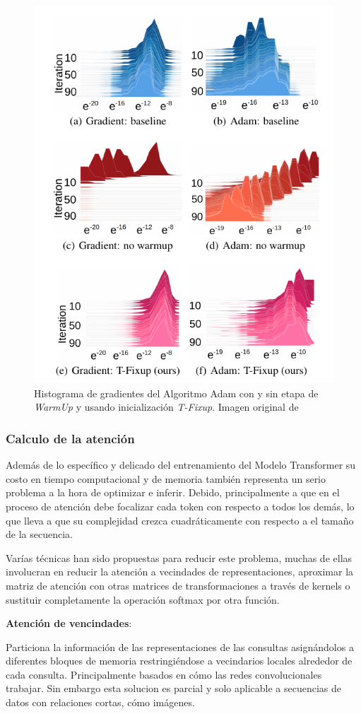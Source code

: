 \begin{figure}[ht!]
    \centering
    \includegraphics[width=0.5 \textwidth]{Chapters/1. Transformer/Figures/transformer/tfixup.png}
    \caption{Histograma de gradientes del Algoritmo Adam con y sin etapa de \textit{WarmUp} y
    usando inicialización \textit{T-Fixup}. Imagen original de \citeauthor{pmlr-v119-huang20f}}
    \label{fig:t-fixup}
\end{figure}

\subsubsection{Calculo de la atención}

Además de lo específico y delicado del entrenamiento del Modelo Transformer su costo en tiempo
computacional y de memoria también representa un serio problema a la hora de optimizar e inferir.
Debido, principalmente a que en el proceso de atención debe focalizar cada token con respecto a todos
los demás, lo que lleva a que su complejidad crezca cuadráticamente con respecto a el tamaño de la
secuencia.

Varías técnicas han sido propuestas para reducir este problema, muchas de ellas involucran en reducir
la atención a vecindades de representaciones, aproximar la matriz de atención con otras matrices de
transformaciones a través de kernels o sustituir completamente la operación softmax por otra función.

\textbf{Atención de vencindades}:

\citeauthor*{DBLP:journals/corr/abs-1802-05751} Particiona la información de las representaciones de
las consultas asignándolos a diferentes bloques de memoria restringiéndose a vecindarios locales
alrededor de cada consulta. Principalmente basados en cómo las redes convolucionales trabajar. Sin
embargo esta solucion es parcial y solo aplicable a secuencias de datos con relaciones cortas, cómo
imágenes.

